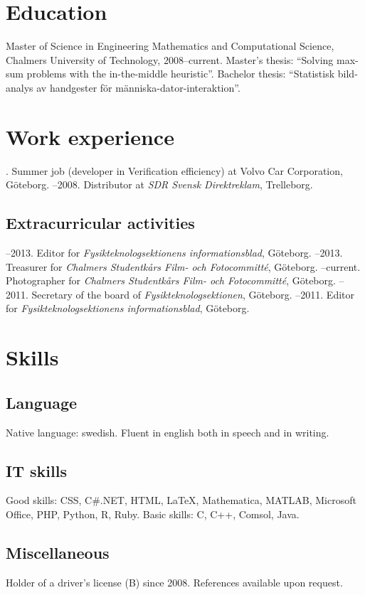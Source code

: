 \documentclass{skvitae}
\author{Simon Sigurdhsson}
\affiliation{}
\begin{document}
	\maketitle

	\section{Education}
	\ind Master of Science in Engineering Mathematics and Computational Science, Chalmers University of Technology, 2008--current. Master's thesis: \enquote{Solving max-sum problems with the in-the-middle heuristic}. Bachelor thesis: \foreignquote{swedish}{Statistisk bildanalys av handgester för människa-dator-interaktion}.

	\section{Work experience}
	. Summer job (developer in Verification efficiency) at Volvo Car Corporation, Göteborg.
	--2008. Distributor at \emph{SDR Svensk Direktreklam}, Trelleborg.

	\medskip
	\subsection{Extracurricular activities}
	--2013. Editor for \emph{Fysikteknologsektionens informationsblad}, Göteborg.
	--2013. Treasurer for \emph{Chalmers Studentkårs Film- och Fotocommitté}, Göteborg.
	--current. Photographer for \emph{Chalmers Studentkårs Film- och Fotocommitté}, Göteborg.
	--2011. Secretary of the board of \emph{Fysikteknologsektionen}, Göteborg.
	--2011. Editor for \emph{Fysikteknologsektionens informationsblad}, Göteborg.

	\section{Skills}
	\subsection{Language}
	\ind Native language: swedish. Fluent in english both in speech and in writing.

	\medskip
	\subsection{IT skills}
	\ind Good skills: CSS, C\#.NET, HTML, \LaTeX, Mathematica, MATLAB, Microsoft Office, PHP, Python, R, Ruby.
	\ind Basic skills: C, C++, Comsol, Java.

	\medskip
	\subsection{Miscellaneous}
	\ind Holder of a driver's license (B) since 2008.
	\ind References available upon request.
\end{document}
